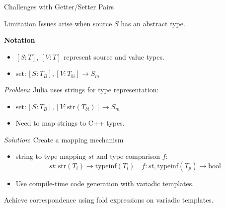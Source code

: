 \begin{frame}{Challenges with Getter/Setter Pairs}
    \begin{block}{Limitation} 
        Issues arise when source $S$ has an abstract type.
    \end{block}
    \textbf{Notation}
        \begin{itemize}
            \item $[S: T]$, $[V: T]$ represent source and value types.
            \item $\text{set}: [S: T_B], [V: T_{bi}] \rightarrow S_m$
        \end{itemize}
    \textit{Problem}: Julia uses strings for type representation:
        \begin{itemize}
            \item $\text{set}: [S: T_B], [V: \text{str}(T_{bi})] \rightarrow S_m$
            \item Need to map strings to C++ types.
        \end{itemize}
    \textit{Solution}: Create a mapping mechanism
        \begin{itemize}
            \item string to type mapping $st$ and type comparison $f$:
            \[
                st: \text{str}(T_i) \rightarrow \text{typeinf}(T_i) \quad f: st, \text{typeinf}(T_p) \rightarrow \text{bool}
            \]
            \item Use compile-time code generation with variadic templates.
        \end{itemize}
    Achieve correspondence using fold expressions on variadic templates.
\end{frame}